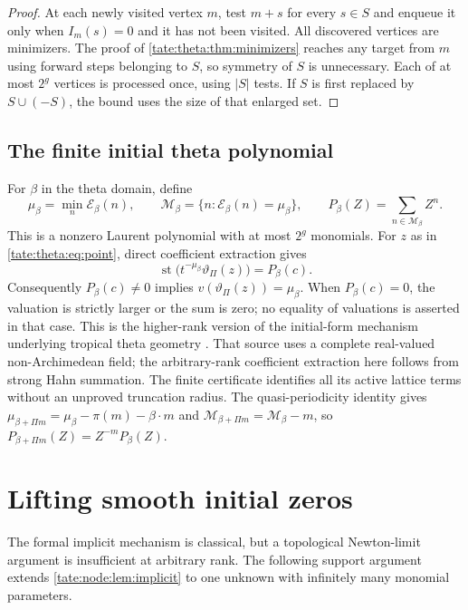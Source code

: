 \documentclass[11pt,letterpaper]{article}
\theoremstyle{definition}
\newcommand{\st}{\operatorname{st}}
\newcommand{\cE}{\mathcal E}
\newcommand{\cM}{\mathcal M}
\begin{document}
\begin{proof}
At each newly visited vertex $m$, test $m+s$ for every $s\in S$ and
enqueue it only when $I_m(s)=0$ and it has not been visited. All
discovered vertices are minimizers. The proof of
\cref{tate:theta:thm:minimizers} reaches any target from $m$ using
forward steps belonging to $S$, so symmetry of $S$ is unnecessary.
Each of at most $2^g$ vertices is processed once, using $|S|$ tests.
If $S$ is first replaced by $S\cup(-S)$, the bound uses the size of
that enlarged set.
\end{proof}

\subsection{The finite initial theta polynomial}

For $\beta$ in the theta domain, define
\begin{equation}
 \mu_\beta=\min_n\cE_\beta(n),\qquad
 \cM_\beta=\{n:\cE_\beta(n)=\mu_\beta\},\qquad
 P_\beta(Z)=\sum_{n\in\cM_\beta}Z^n.\label{tate:theta:eq:initial}
\end{equation}
This is a nonzero Laurent polynomial with at most $2^g$ monomials. For $z$
as in \eqref{tate:theta:eq:point}, direct coefficient extraction gives
\begin{equation}
 \st\bigl(t^{-\mu_\beta}\vartheta_\Pi(z)\bigr)=P_\beta(c).
 \label{tate:theta:eq:initialvalue}
\end{equation}
Consequently $P_\beta(c)\ne0$ implies $v(\vartheta_\Pi(z))=\mu_\beta$. When
$P_\beta(c)=0$, the valuation is strictly larger or the sum is zero; no
equality of valuations is asserted in that case. This is the higher-rank
version of the initial-form mechanism underlying tropical theta geometry
\cite[\S1.1 and Theorem~4.10]{FRSS}. That source uses a complete
real-valued non-Archimedean field; the arbitrary-rank coefficient
extraction here follows from strong Hahn summation. The finite certificate identifies all its active lattice terms
without an unproved truncation radius. The quasi-periodicity identity gives
$\mu_{\beta+\Pi m}=\mu_\beta-\pi(m)-\beta\cdot m$ and
$\cM_{\beta+\Pi m}=\cM_\beta-m$, so
$P_{\beta+\Pi m}(Z)=Z^{-m}P_\beta(Z)$.

\section{Lifting smooth initial zeros}\label{tate:theta:sec:zeros}

The formal implicit mechanism is classical, but a topological Newton-limit
argument is insufficient at arbitrary rank. The following support argument
extends \cref{tate:node:lem:implicit} to one unknown with infinitely many
monomial parameters.
\end{document}
